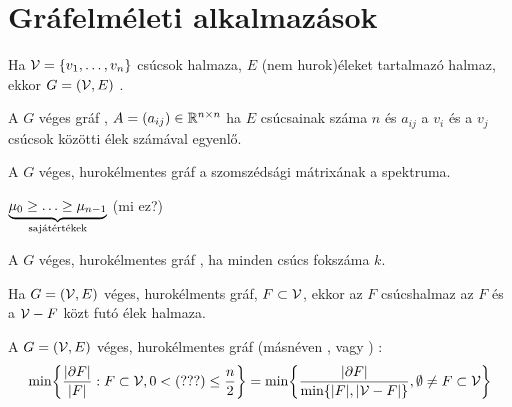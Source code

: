 \section{Gráfelméleti alkalmazások}
\begin{ff}
	Ha $\mathcal{V}=\{v_1,\ldots,v_n\}$ csúcsok halmaza, $E$ (nem hurok)éleket
	tartalmazó halmaz, ekkor $G=(\mathcal{V},E)$ .
\end{ff}

\begin{ff}
	A $G$ véges gráf ,
	$A=(a_{ij})\in\mathbb{R}^{n\times n}$ ha $E$ csúcsainak száma $n$ és $a_{ij}$ a $v_i$ és a
	$v_j$ csúcsok közötti élek számával egyenlő.
\end{ff}

\begin{ff}
	A $G$ véges, hurokélmentes gráf  a szomszédsági mátrixának
	a spektruma.
\end{ff}

\begin{jel}
	$\underbrace{\mu_0\ge\ldots\ge\mu_{n-1}}_{\text{sajátértékek}}$ (mi ez?)
\end{jel}

\begin{ff}
	A $G$ véges, hurokélmentes gráf , ha minden csúcs fokszáma
	$k$.
\end{ff}

\begin{ff}
	Ha $G=(\mathcal{V},E)$ véges, hurokélments gráf, $F\subset\mathcal{V}$, ekkor az $F$
	csúcshalmaz  az $F$ és a $\mathcal{V}-F$ közt futó élek halmaza.
\end{ff}

\begin{jel}
\end{jel}


\begin{ff}
	A $G=(\mathcal{V},E)$ véges, hurokélmentes gráf  (másnéven
	, vagy ) :
	\begin{equation*}
		\min\hz*{\f{\abs{\partial
		F}}{\abs{F}}:F\subset\V,0<\text{(???)}\leq\f{n}{2}}=
		\min\hz*{\f{\abs{\partial
		F}}{\min\hz*{\abs{F},\abs{\V-F}}},\emptyset\neq F\subset\V}
	\end{equation*}
\end{ff}
